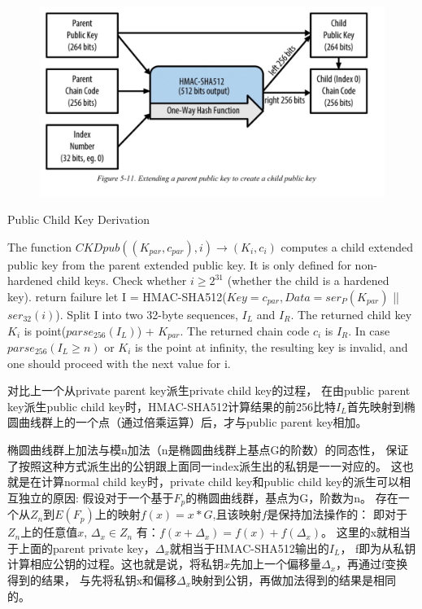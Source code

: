 \begin{figure}[h]
\centering
\includegraphics[width=\textwidth]{./CKDpub.png}
\caption{}\label{fig-parsesig}
\end{figure}

\begin{algorithm}[tbp]\footnotesize
\caption{Public Child Key Derivation}
  	\begin{algorithmic}[1]
	    \STATE The function $CKDpub((K_{par}, c_{par}), i) \rightarrow (K_i, c_i)$ computes 
	    a child extended public key from the parent extended public key. 
	    It is only defined for non-hardened child keys.
		\STATE Check whether $i \geq 2^{31}$ (whether the child is a hardened key).
			\STATE return failure  
		\ELSE
			\STATE let I = HMAC-SHA512($Key = c_{par}, Data = ser_P(K_{par})$ || $ser_{32}(i)$). 
		\ENDIF
		\STATE Split I into two 32-byte sequences, $I_L$ and $I_R$.
		\STATE The returned child key $K_i$ is point($parse_{256}(I_L)$) + $K_{par}$.  
		\STATE The returned chain code $c_i$ is $I_R$.  
		\STATE In case $parse_{256}(I_L\geq n)$  or $K_i$ is the
		 point at infinity, the resulting key is invalid, and one should proceed with 
		 the next value for i. 
    \end{algorithmic}
\end{algorithm}

对比上一个从private parent key派生private child key的过程，
在由public parent key派生public child key时，HMAC-SHA512计算结果的前256比特$I_L$首先映射到椭圆曲线群上的一个点（通过倍乘运算）后，才与public parent key相加。

椭圆曲线群上加法与模n加法（n是椭圆曲线群上基点G的阶数）的同态性，
保证了按照这种方式派生出的公钥跟上面同一index派生出的私钥是一一对应的。
这也就是在计算normal child key时，private child key和public child key的派生可以相互独立的原因:
假设对于一个基于$F_p$的椭圆曲线群，基点为G，阶数为n。
存在一个从$Z_n$到$E(F_p)$上的映射$f(x)=x*G$,且该映射$f$是保持加法操作的：
即对于$Z_n$上的任意值$x$, $\Delta_x \in Z_n$ 有：$f(x+\Delta_x)=f(x)+f(\Delta_x)$。   
这里的x就相当于上面的parent private key，$\Delta_x$就相当于HMAC-SHA512输出的$I_L$，
f即为从私钥计算相应公钥的过程。这也就是说，将私钥$x$先加上一个偏移量$\Delta_x$，再通过f变换得到的结果，
与先将私钥x和偏移$\Delta_x$映射到公钥，再做加法得到的结果是相同的。

